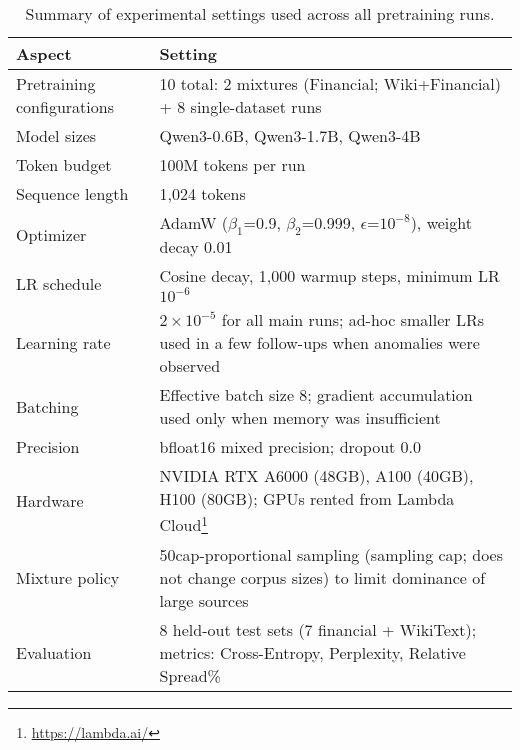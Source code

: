 \begin{table}[htbp]
\centering
\caption[Experimental Settings Summary]{Summary of experimental settings used across all pretraining runs.}
\label{tab:exp_settings}
\small
\begin{tabular}{p{3.8cm} p{9.5cm}}
\toprule
\textbf{Aspect} & \textbf{Setting} \\
\midrule
Pretraining configurations & 10 total: 2 mixtures (Financial; Wiki+Financial) + 8 single-dataset runs \\
Model sizes & Qwen3-0.6B, Qwen3-1.7B, Qwen3-4B \\
Token budget & 100M tokens per run \\
Sequence length & 1{,}024 tokens \\
Optimizer & AdamW ($\beta_1$=0.9, $\beta_2$=0.999, $\epsilon$=$10^{-8}$), weight decay 0.01 \\
LR schedule & Cosine decay, 1{,}000 warmup steps, minimum LR $10^{-6}$ \\
Learning rate & $2\times10^{-5}$ for all main runs; ad-hoc smaller LRs used in a few follow-ups when anomalies were observed \\
Batching & Effective batch size 8; gradient accumulation used only when memory was insufficient \\
Precision & bfloat16 mixed precision; dropout 0.0 \\
Hardware & NVIDIA RTX A6000 (48GB), A100 (40GB), H100 (80GB); GPUs rented from Lambda Cloud\footnote{\url{https://lambda.ai/}} \\
Mixture policy & 50cap-proportional sampling (sampling cap; does not change corpus sizes) to limit dominance of large sources \\
Evaluation & 8 held-out test sets (7 financial + WikiText); metrics: Cross-Entropy, Perplexity, Relative Spread\% \\
\bottomrule
\end{tabular}
\end{table}
